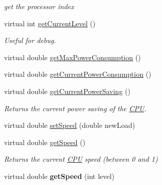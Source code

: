 \begin{DoxyCompactItemize}
\begin{DoxyCompactList}\small\item\em get the processor index \end{DoxyCompactList}\item 
virtual int \hyperlink{classRTSim_1_1CPU_a3c5fe25a63904a5e79128a4a4ec71db0}{get\+Current\+Level} ()\hypertarget{classRTSim_1_1CPU_a3c5fe25a63904a5e79128a4a4ec71db0}{}\label{classRTSim_1_1CPU_a3c5fe25a63904a5e79128a4a4ec71db0}

\begin{DoxyCompactList}\small\item\em Useful for debug. \end{DoxyCompactList}\item 
virtual double \hyperlink{classRTSim_1_1CPU_acac71817907334e59c558d9fb83cade7}{get\+Max\+Power\+Consumption} ()
\item 
virtual double \hyperlink{classRTSim_1_1CPU_a978247983a8ba75b8773dd174296de96}{get\+Current\+Power\+Consumption} ()
\item 
virtual double \hyperlink{classRTSim_1_1CPU_abf1e8e35e7eb99f27596e7bab22fc359}{get\+Current\+Power\+Saving} ()\hypertarget{classRTSim_1_1CPU_abf1e8e35e7eb99f27596e7bab22fc359}{}\label{classRTSim_1_1CPU_abf1e8e35e7eb99f27596e7bab22fc359}

\begin{DoxyCompactList}\small\item\em Returns the current power saving of the \hyperlink{classRTSim_1_1CPU}{C\+PU}. \end{DoxyCompactList}\item 
virtual double \hyperlink{classRTSim_1_1CPU_aee85ed5c45600ffb633818da95300c56}{set\+Speed} (double new\+Load)
\item 
virtual double \hyperlink{classRTSim_1_1CPU_a0c948a9cc83244de81a66bdc154d95f6}{get\+Speed} ()\hypertarget{classRTSim_1_1CPU_a0c948a9cc83244de81a66bdc154d95f6}{}\label{classRTSim_1_1CPU_a0c948a9cc83244de81a66bdc154d95f6}

\begin{DoxyCompactList}\small\item\em Returns the current \hyperlink{classRTSim_1_1CPU}{C\+PU} speed (between 0 and 1) \end{DoxyCompactList}\item 
virtual double {\bfseries get\+Speed} (int level)\hypertarget{classRTSim_1_1CPU_aaf3f4a37699fb1d18eac2f8b81484b3e}{}\label{classRTSim_1_1CPU_aaf3f4a37699fb1d18eac2f8b81484b3e}


\end{DoxyCompactItemize}
